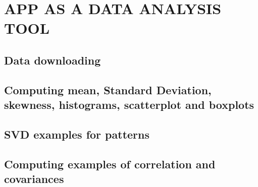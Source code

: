\chapter{APP AS A DATA ANALYSIS TOOL}
\label{chap:conclusion}

\section{Data downloading}


\section{Computing mean, Standard Deviation, skewness, histograms, scatterplot and boxplots}


\section{SVD examples for patterns}

\section{Computing examples of correlation and covariances}

